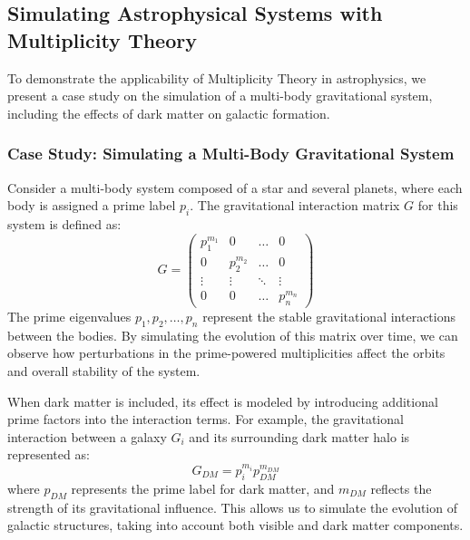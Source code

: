 \documentclass[%
 preprint, linenumbers,
 amsmath,amssymb,
 aps, physrev,
]{revtex4-2}
\begin{document}
\subsection{Simulating Astrophysical Systems with Multiplicity Theory}
To demonstrate the applicability of Multiplicity Theory in astrophysics, we present a case study on the simulation of a multi-body gravitational system, including the effects of dark matter on galactic formation.

\subsubsection{Case Study: Simulating a Multi-Body Gravitational System}
Consider a multi-body system composed of a star and several planets, where each body is assigned a prime label \( p_i \). The gravitational interaction matrix \( G \) for this system is defined as:
\[
G = \begin{pmatrix} p_1^{m_1} & 0 & \dots & 0 \\ 0 & p_2^{m_2} & \dots & 0 \\ \vdots & \vdots & \ddots & \vdots \\ 0 & 0 & \dots & p_n^{m_n} \end{pmatrix}
\]
The prime eigenvalues \( p_1, p_2, \dots, p_n \) represent the stable gravitational interactions between the bodies. By simulating the evolution of this matrix over time, we can observe how perturbations in the prime-powered multiplicities affect the orbits and overall stability of the system.

When dark matter is included, its effect is modeled by introducing additional prime factors into the interaction terms. For example, the gravitational interaction between a galaxy \( G_i \) and its surrounding dark matter halo is represented as:
\[
G_{DM} = p_i^{m_i} p_{DM}^{m_{DM}}
\]
where \( p_{DM} \) represents the prime label for dark matter, and \( m_{DM} \) reflects the strength of its gravitational influence. This allows us to simulate the evolution of galactic structures, taking into account both visible and dark matter components.
\end{document}
